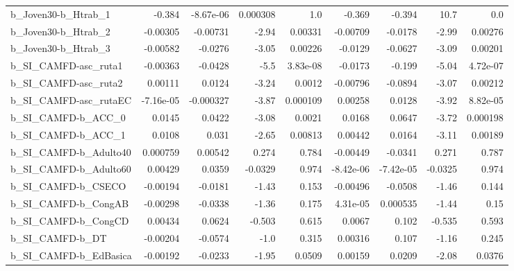 \begin{tabular}{lrrrrrrrr}
b\_Joven30-b\_Htrab\_1        &      -0.384 &    -8.67e-06 &  0.000308 &      1.0 &     -0.369 &      -0.394 &         10.7 &           0.0 \\
b\_Joven30-b\_Htrab\_2        &    -0.00305 &     -0.00731 &     -2.94 &  0.00331 &   -0.00709 &     -0.0178 &        -2.99 &       0.00276 \\
b\_Joven30-b\_Htrab\_3        &    -0.00582 &      -0.0276 &     -3.05 &  0.00226 &    -0.0129 &     -0.0627 &        -3.09 &       0.00201 \\
b\_SI\_CAMFD-asc\_ruta1       &    -0.00363 &      -0.0428 &      -5.5 & 3.83e-08 &    -0.0173 &      -0.199 &        -5.04 &      4.72e-07 \\
b\_SI\_CAMFD-asc\_ruta2       &     0.00111 &       0.0124 &     -3.24 &   0.0012 &   -0.00796 &     -0.0894 &        -3.07 &       0.00212 \\
b\_SI\_CAMFD-asc\_rutaEC      &   -7.16e-05 &    -0.000327 &     -3.87 & 0.000109 &    0.00258 &      0.0128 &        -3.92 &      8.82e-05 \\
b\_SI\_CAMFD-b\_ACC\_0         &      0.0145 &       0.0422 &     -3.08 &   0.0021 &     0.0168 &      0.0647 &        -3.72 &      0.000198 \\
b\_SI\_CAMFD-b\_ACC\_1         &      0.0108 &        0.031 &     -2.65 &  0.00813 &    0.00442 &      0.0164 &        -3.11 &       0.00189 \\
b\_SI\_CAMFD-b\_Adulto40      &    0.000759 &      0.00542 &     0.274 &    0.784 &   -0.00449 &     -0.0341 &        0.271 &         0.787 \\
b\_SI\_CAMFD-b\_Adulto60      &     0.00429 &       0.0359 &   -0.0329 &    0.974 &  -8.42e-06 &   -7.42e-05 &      -0.0325 &         0.974 \\
b\_SI\_CAMFD-b\_CSECO         &    -0.00194 &      -0.0181 &     -1.43 &    0.153 &   -0.00496 &     -0.0508 &        -1.46 &         0.144 \\
b\_SI\_CAMFD-b\_CongAB        &    -0.00298 &      -0.0338 &     -1.36 &    0.175 &   4.31e-05 &    0.000535 &        -1.44 &          0.15 \\
b\_SI\_CAMFD-b\_CongCD        &     0.00434 &       0.0624 &    -0.503 &    0.615 &     0.0067 &       0.102 &       -0.535 &         0.593 \\
b\_SI\_CAMFD-b\_DT            &    -0.00204 &      -0.0574 &      -1.0 &    0.315 &    0.00316 &       0.107 &        -1.16 &         0.245 \\
b\_SI\_CAMFD-b\_EdBasica      &    -0.00192 &      -0.0233 &     -1.95 &   0.0509 &    0.00159 &      0.0209 &        -2.08 &        0.0376 \\

\end{tabular}
